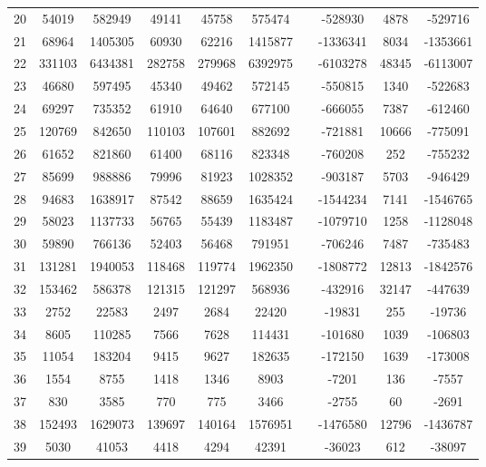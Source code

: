 \documentclass{article}
\begin{document}
\begin{table}[h!]
\begin{tabular}{c||c|c|c|c|c c c|c|c}
20 & 54019 & 582949 & 49141 & 45758 & 575474 &  & -528930 & 4878 & -529716 \\
21 & 68964 & 1405305 & 60930 & 62216 & 1415877 &  & -1336341 & 8034 & -1353661 \\
22 & 331103 & 6434381 & 282758 & 279968 & 6392975 &  & -6103278 & 48345 & -6113007 \\
23 & 46680 & 597495 & 45340 & 49462 & 572145 &  & -550815 & 1340 & -522683 \\
24 & 69297 & 735352 & 61910 & 64640 & 677100 &  & -666055 & 7387 & -612460 \\
25 & 120769 & 842650 & 110103 & 107601 & 882692 &  & -721881 & 10666 & -775091 \\
26 & 61652 & 821860 & 61400 & 68116 & 823348 &  & -760208 & 252 & -755232 \\
27 & 85699 & 988886 & 79996 & 81923 & 1028352 &  & -903187 & 5703 & -946429 \\
28 & 94683 & 1638917 & 87542 & 88659 & 1635424 &  & -1544234 & 7141 & -1546765 \\
29 & 58023 & 1137733 & 56765 & 55439 & 1183487 &  & -1079710 & 1258 & -1128048 \\
30 & 59890 & 766136 & 52403 & 56468 & 791951 &  & -706246 & 7487 & -735483 \\
31 & 131281 & 1940053 & 118468 & 119774 & 1962350 &  & -1808772 & 12813 & -1842576 \\
32 & 153462 & 586378 & 121315 & 121297 & 568936 &  & -432916 & 32147 & -447639 \\
33 & 2752 & 22583 & 2497 & 2684 & 22420 &  & -19831 & 255 & -19736 \\
34 & 8605 & 110285 & 7566 & 7628 & 114431 &  & -101680 & 1039 & -106803 \\
35 & 11054 & 183204 & 9415 & 9627 & 182635 &  & -172150 & 1639 & -173008 \\
36 & 1554 & 8755 & 1418 & 1346 & 8903 &  & -7201 & 136 & -7557 \\
37 & 830 & 3585 & 770 & 775 & 3466 &  & -2755 & 60 & -2691 \\
38 & 152493 & 1629073 & 139697 & 140164 & 1576951 &  & -1476580 & 12796 & -1436787 \\
39 & 5030 & 41053 & 4418 & 4294 & 42391 &  & -36023 & 612 & -38097 \\
 \end{tabular}
\end{table}
\end{document}
